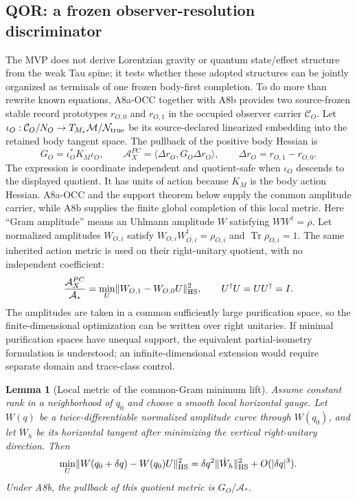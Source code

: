 \documentclass[11pt]{article}
\newtheorem{lemma}{Lemma}
\begin{document}
\subsection{QOR: a frozen observer-resolution discriminator}
\label{sec:qor}

The MVP does not derive Lorentzian gravity or quantum state/effect structure
from the weak Tau spine; it tests whether these adopted structures can be
jointly organized as terminals of one frozen body-first completion.  To do
more than rewrite known equations, A8a-OCC together with A8b
provides two source-frozen stable record prototypes \(r_{O,0}\) and
\(r_{O,1}\) in the occupied observer carrier \(\mathcal C_O\).  Let
\(\iota_O:\mathcal C_O/N_O\to T_{M_*}\mathcal M/\mathcal N_{\rm true}\)
be its source-declared linearized embedding into the retained body tangent space.  The
pullback of the positive body Hessian is
\begin{equation}
  G_O=\iota_O^*K_M\iota_O,
  \qquad
  \mathcal A_X^{PC}
  =\langle\Delta r_O,G_O\Delta r_O\rangle,
  \qquad
  \Delta r_O=r_{O,1}-r_{O,0}.
  \label{eq:observer-pullback-metric}
\end{equation}
The expression is coordinate independent and quotient-safe when \(\iota_O\)
descends to the displayed quotient.  It has units of action because \(K_M\)
is the body action Hessian.  A8a-OCC and the support theorem below supply the
common amplitude carrier, while A8b supplies the finite global completion of
this local metric.  Here ``Gram amplitude'' means an Uhlmann
amplitude \(W\) satisfying \(WW^\dagger=\rho\).  Let normalized amplitudes
\(W_{O,i}\) satisfy \(W_{O,i}W_{O,i}^\dagger=\rho_{O,i}\) and
\(\operatorname{Tr}\rho_{O,i}=1\).  The same inherited action metric is used
on their right-unitary quotient, with no independent coefficient:
\begin{equation}
 \frac{\mathcal A_X^{PC}}{\mathcal A_*}
 =\min_U\lVert W_{O,1}-W_{O,0}U\rVert_{\rm HS}^2,
 \qquad U^\dagger U=UU^\dagger=I.
 \label{eq:common-gram-minimum-lift}
\end{equation}
The amplitudes are taken in a common sufficiently large purification space, so
the finite-dimensional optimization can be written over right unitaries.  If
minimal purification spaces have unequal support, the equivalent
partial-isometry formulation is understood; an infinite-dimensional extension
would require separate domain and trace-class control.

\begin{lemma}[Local metric of the common-Gram minimum lift]
Assume constant rank in a neighborhood of \(q_0\) and choose a smooth local
horizontal gauge.  Let \(W(q)\) be a twice-differentiable normalized amplitude
curve through \(W(q_0)\),
and let \(\dot W_h\) be its horizontal tangent after minimizing the vertical
right-unitary direction.  Then
\begin{equation}
 \min_U\lVert W(q_0+\delta q)-W(q_0)U\rVert_{\rm HS}^2
 =\delta q^2\lVert\dot W_h\rVert_{\rm HS}^2+O(|\delta q|^3).
 \label{eq:minimum-lift-second-variation}
\end{equation}
Under A8b, the pullback of this quotient metric is
\(G_O/\mathcal A_*\).
\end{lemma}
\end{document}
